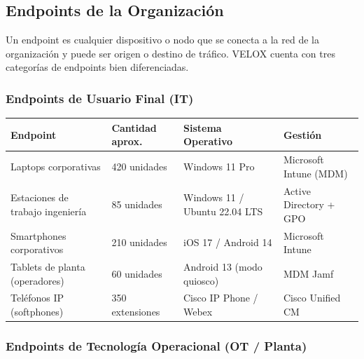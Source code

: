 \documentclass[letterpaper,11pt]{article}
\begin{document}
\subsection{Endpoints de la Organización}

Un endpoint es cualquier dispositivo o nodo que se conecta a la red de la organización y puede ser origen o destino de tráfico. VELOX cuenta con tres categorías de endpoints bien diferenciadas.

\subsubsection{Endpoints de Usuario Final (IT)}

\vspace{0.2cm}
\begingroup
\small
{}
\begin{tabular}{|p{3.8cm}|p{3.5cm}|p{3.5cm}|p{2.5cm}|}
\hline
\rowcolor{blue!22}
\textbf{Endpoint} & \textbf{Cantidad aprox.} & \textbf{Sistema Operativo} & \textbf{Gestión} \\
\hline
Laptops corporativas & 420 unidades & Windows 11 Pro & Microsoft Intune (MDM) \\
\hline
Estaciones de trabajo ingeniería & 85 unidades & Windows 11 / Ubuntu 22.04 LTS & Active Directory + GPO \\
\hline
Smartphones corporativos & 210 unidades & iOS 17 / Android 14 & Microsoft Intune \\
\hline
Tablets de planta (operadores) & 60 unidades & Android 13 (modo quiosco) & MDM Jamf \\
\hline
Teléfonos IP (softphones) & 350 extensiones & Cisco IP Phone / Webex & Cisco Unified CM \\
\hline
\end{tabular}
\endgroup

\subsubsection{Endpoints de Tecnología Operacional (OT / Planta)}
\end{document}
